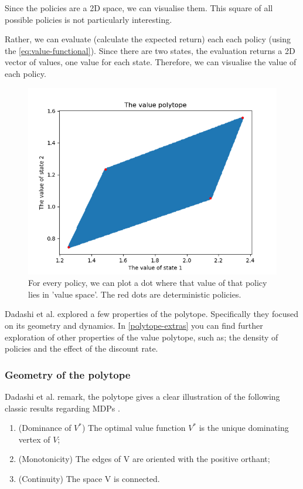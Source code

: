Since the policies are a 2D space, we can visualise them. This square of all possible policies is not particularly interesting.

Rather, we can evaluate (calculate the expected return) each each policy (using the \eqref{eq:value-functional}).
Since there are two states, the evaluation returns a 2D vector of values, one value for each state.
Therefore, we can visualise the value of each policy.
\begin{figure}[!hb]
\centering
\includegraphics[width=1\textwidth,height=0.5\textheight]{../../pictures/figures/value-polytope.png}
\caption{For every policy, we can plot a dot where that value of that policy lies in 'value space'.
The red dots are deterministic policies.}
\end{figure}

Dadashi et al. \cite{Dadashi2018} explored a few properties of the polytope.
Specifically they focused on its geometry and dynamics. In
\ref{polytope-extras} you can find further exploration of other properties of
the value polytope, such as; the density of policies and the effect of the discount rate.

\subsubsection{Geometry of the polytope}

Dadashi et al. remark, the polytope gives a clear illustration of the following classic results regarding MDPs \cite{Bertsekas1996}.

\begin{enumerate}
\tightlist
  \item (Dominance of $V^*$) The optimal value function $V^*$ is the unique dominating vertex of $V$;
  \item (Monotonicity) The edges of V are oriented with the positive orthant;
  \item (Continuity) The space V is connected.
\end{enumerate}

